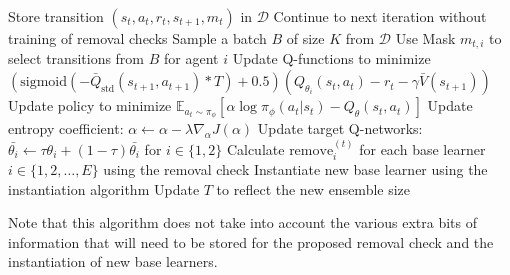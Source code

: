 \begin{algorithm}
\begin{algorithmic}[1]
        \State Store transition $(s_{t}, a_{t}, r_{t}, s_{t+1}, m_t)$ in $\mathcal{D}$
    \EndFor
        \State Continue to next iteration without training of removal checks
    \EndIf
        \State Sample a batch $B$ of size $K$ from $\mathcal{D}$
            \State Use Mask $m_{t,i}$ to select transitions from $B$ for agent $i$
            \State Update Q-functions to minimize $(\text{sigmoid}(-\bar{Q}_{\text{std}}(s_{t+1}, a_{t+1})*T)+0.5)(Q_{\theta_i}(s_t, a_t)-r_t-\gamma \bar{V}(s_{t+1}))$
            \State Update policy to minimize $\mathbb{E}_{a_t \sim \pi_\phi}\left[ \alpha \log \pi_\phi (a_t|s_t) - Q_\theta(s_t, a_t)\right]$
            \State Update entropy coefficient: $\alpha \gets \alpha - \lambda \hat{\nabla}_{\alpha} J(\alpha)$
            \State Update target Q-networks: $\bar{\theta_{i}} \gets \tau\theta_{i} + (1 - \tau) \bar{\theta_{i}}$ for $i \in \{1,2\}$
        \EndFor
    \EndFor
        \State Calculate $\text{remove}_i^{(t)}$ for each base learner $i \in \{1,2,\ldots,E\}$ using the removal check
            \State Instantiate new base learner using the instantiation algorithm
            \State Update $T$ to reflect the new ensemble size
        \EndFor
    \EndIf
{}

\end{algorithmic}
\end{algorithm}

Note that this algorithm does not take into account the various extra bits of information that will need to be stored for the proposed removal check and the instantiation of new base learners.